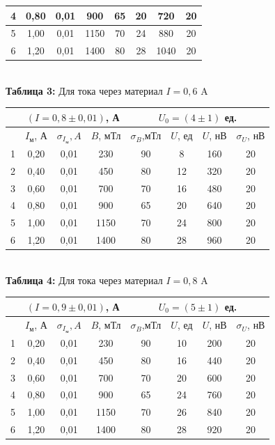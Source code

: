 \documentclass[a4paper, 12pt]{article}%
\begin{document}
\begin{center}
\begin{tabular}{|c|c|c|c|c|c|c|c|}
4 & 0,80 & 0,01 & 900 & 65 & 20 & 720 & 20 \\ \hline
5 & 1,00 & 0,01 & 1150 & 70 & 24 & 880 & 20 \\ \hline
6 & 1,20 & 0,01 & 1400 & 80 & 28 & 1040 & 20 \\ \hline
\end{tabular}\\
\textbf{Таблица 3:} Для тока через материал $I = 0,6$ A\\
\begin{tabular}{|c|c|c|c|c|c|c|c|}
\hline
 & \multicolumn{3}{c|}{$(I = 0,8 \pm 0,01)$, А} & \multicolumn{4}{c|}{$U_0 = (4 \pm 1)$ ед.} \\ \hline
 & $I_{\text{м}}$, А & $\sigma_{I_{\text{м}}}, A$ & $B$, мТл & $\sigma_B$,мТл & $U$, ед & $U$, нВ & $\sigma_{U}$, нВ \\ \hline
1 & 0,20 & 0,01 & 230 & 90 & 8 & 160 & 20 \\ \hline
2 & 0,40 & 0,01 & 450 & 80 & 12 & 320 & 20 \\ \hline
3 & 0,60 & 0,01 & 700 & 70 & 16 & 480 & 20 \\ \hline
4 & 0,80 & 0,01 & 900 & 65 & 20 & 640 & 20 \\ \hline
5 & 1,00 & 0,01 & 1150 & 70 & 24 & 800 & 20 \\ \hline
6 & 1,20 & 0,01 & 1400 & 80 & 28 & 960 & 20 \\ \hline
\end{tabular}\\
\textbf{Таблица 4:} Для тока через материал $I = 0,8$ A\\
\begin{tabular}{|c|c|c|c|c|c|c|c|}
\hline
 & \multicolumn{3}{c|}{$(I = 0,9 \pm 0,01)$, А} & \multicolumn{4}{c|}{$U_0 = (5 \pm 1)$ ед.} \\ \hline
 & $I_{\text{м}}$, А & $\sigma_{I_{\text{м}}}, A$ & $B$, мТл & $\sigma_B$,мТл & $U$, ед & $U$, нВ & $\sigma_{U}$, нВ \\ \hline
1 & 0,20 & 0,01 & 230 & 90 & 10 & 200 & 20 \\ \hline
2 & 0,40 & 0,01 & 450 & 80 & 16 & 440 & 20 \\ \hline
3 & 0,60 & 0,01 & 700 & 70 & 20 & 600 & 20 \\ \hline
4 & 0,80 & 0,01 & 900 & 65 & 24 & 760 & 20 \\ \hline
5 & 1,00 & 0,01 & 1150 & 70 & 26 & 840 & 20 \\ \hline
6 & 1,20 & 0,01 & 1400 & 80 & 28 & 920 & 20 \\ \hline
\end{tabular}\\

\end{center}
\end{document}
